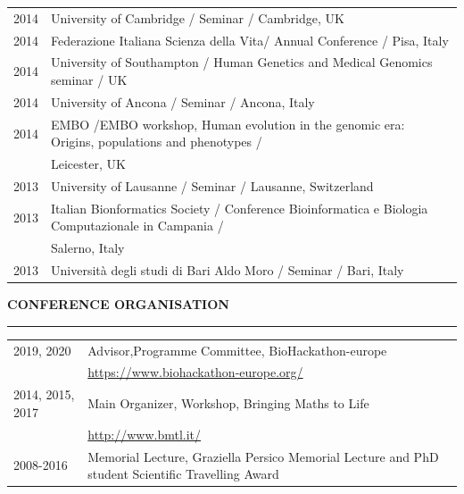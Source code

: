 \documentclass[openany]{book}
\begin{document}
\begin{tabular}{ l l }
2014 &  University of Cambridge / Seminar / Cambridge, UK\\
2014 &  Federazione Italiana Scienza della Vita/ Annual Conference / Pisa, Italy\\
2014 & University of Southampton / Human Genetics and Medical Genomics seminar / UK\\
2014 & University of Ancona / Seminar / Ancona, Italy\\
2014 & EMBO /EMBO workshop, Human evolution in the genomic era: Origins, populations and phenotypes /\\ & Leicester, UK\\
2013 & University of Lausanne / Seminar / Lausanne, Switzerland\\
2013 & Italian Bionformatics Society / Conference Bioinformatica e Biologia Computazionale in Campania /\\ & Salerno, Italy\\
2013 & Universit\`{a} degli studi di Bari Aldo Moro / Seminar / Bari, Italy\\
\end{tabular}
\newline

\vspace{0.05cm}
\noindent
\MakeUppercase{\textbf{Conference organisation}} 
\vspace{0.2cm}
\sectionlineskip
\hrule
\vspace{0.1cm}
\noindent
\begin{tabular}{l l}
2019, 2020 & Advisor,Programme Committee, BioHackathon-europe\\
 & \url{https://www.biohackathon-europe.org/}\\
2014, 2015, 2017 & Main Organizer, Workshop, Bringing Maths to Life\\
 & \url{http://www.bmtl.it/}\\
2008-2016 & Memorial Lecture, Graziella Persico Memorial Lecture and PhD student Scientific Travelling Award\\
\end{tabular}
\newline
\end{document}

